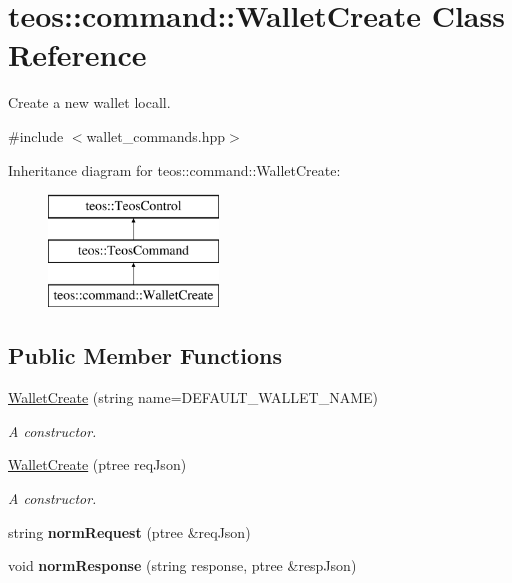 \hypertarget{classteos_1_1command_1_1_wallet_create}{}\section{teos\+:\+:command\+:\+:Wallet\+Create Class Reference}
\label{classteos_1_1command_1_1_wallet_create}


Create a new wallet locall.  




{\ttfamily \#include $<$wallet\+\_\+commands.\+hpp$>$}

Inheritance diagram for teos\+:\+:command\+:\+:Wallet\+Create\+:\begin{figure}[H]
\begin{center}
\leavevmode
\includegraphics[height=3.000000cm]{classteos_1_1command_1_1_wallet_create}
\end{center}
\end{figure}
\subsection*{Public Member Functions}
\begin{DoxyCompactItemize}
\item 
\mbox{\hyperlink{classteos_1_1command_1_1_wallet_create_a78153f8e5eb577cdeb3734c7229df923}{Wallet\+Create}} (string name=D\+E\+F\+A\+U\+L\+T\+\_\+\+W\+A\+L\+L\+E\+T\+\_\+\+N\+A\+ME)
\begin{DoxyCompactList}\small\item\em A constructor. \end{DoxyCompactList}\item 
\mbox{\hyperlink{classteos_1_1command_1_1_wallet_create_a3a7979db66f2ea69186888d50dd6ce69}{Wallet\+Create}} (ptree req\+Json)
\begin{DoxyCompactList}\small\item\em A constructor. \end{DoxyCompactList}\item 
\mbox{\label{classteos_1_1command_1_1_wallet_create_aa95ee68f9139186395722e2028ec6309}} 
string {\bfseries norm\+Request} (ptree \&req\+Json)
\item 
\mbox{\label{classteos_1_1command_1_1_wallet_create_a419455a10d7be5d8264dbfe2bfdf511c}} 
void {\bfseries norm\+Response} (string response, ptree \&resp\+Json)
\end{DoxyCompactItemize}
